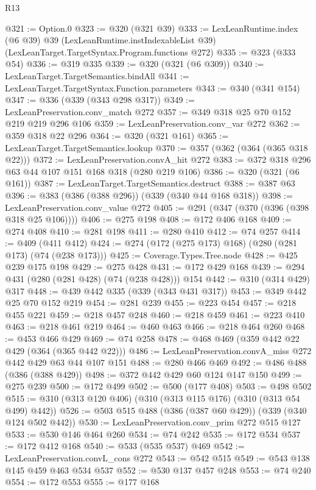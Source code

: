 \begin{lexlean}{R13}
\begin{coremodule}
@321 := Option.{0}
@323 := @320 (@321 @39)
@333 := LexLeanRuntime.index
    (@6 @39)
    @39
    (LexLeanRuntime.instIndexableList @39)
    (LexLeanTarget.TargetSyntax.Program.functions @272)
@335 := @323 (@333 @54)
@336 := @319 @335
@339 := @320 (@321 (@6 @309))
@340 := LexLeanTarget.TargetSemantics.bindAll
@341 := LexLeanTarget.TargetSyntax.Function.parameters
@343 := @340 (@341 @154)
@347 := @336 (@339 (@343 @298 @317))
@349 := LexLeanPreservation.conv_match @272
@357 := @349 @318 @25 @70 @152 @219 @219 @296 @106
@359 := LexLeanPreservation.conv_var @272
@362 := @359 @318 @22 @296
@364 := @320 (@321 @161)
@365 := LexLeanTarget.TargetSemantics.lookup
@370 := @357 (@362 (@364 (@365 @318 @22)))
@372 := LexLeanPreservation.convA_hit @272
@383 := @372 @318 @296 @63 @44 @107 @151 @168 @318 (@280 @219 @106)
@386 := @320 (@321 (@6 @161))
@387 := LexLeanTarget.TargetSemantics.destruct
@388 := @387 @63
@396 := @383 (@386 (@388 @296)) (@339 (@340 @44 @168 @318))
@398 := LexLeanPreservation.conv_value @272
@405 := @291 (@347 (@370 (@396 (@398 @318 @25 @106))))
@406 := @275 @198
@408 := @172 @406 @168
@409 := @274 @408
@410 := @281 @198
@411 := @280 @410
@412 := @74 @257
@414 := @409 (@411 @412)
@424 := @274 (@172 (@275 @173) @168) (@280 (@281 @173) (@74 (@238 @173)))
@425 := Coverage.Types.Tree.node
@428 := @425 @239 @175 @198
@429 := @275 @428
@431 := @172 @429 @168
@439 := @294 @431 (@280 (@281 @428) (@74 (@238 @428))) @154
@442 := @310 (@314 @429) @317
@448 := @439 @442 @335 (@339 (@343 @431 @317))
@453 := @349 @442 @25 @70 @152 @219
@454 := @281 @239
@455 := @223 @454
@457 := @218 @455 @221
@459 := @218 @457 @248
@460 := @218 @459
@461 := @223 @410
@463 := @218 @461 @219
@464 := @460 @463
@466 := @218 @464 @260
@468 := @453 @466 @429
@469 := @74 @258
@478 := @468 @469 (@359 @442 @22 @429 (@364 (@365 @442 @22)))
@486 := LexLeanPreservation.convA_miss @272 @442 @429 @63 @44 @107 @151
@488 := @280 @466 @469
@492 := @486 @488 (@386 (@388 @429))
@498 := @372 @442 @429 @60 @124 @147 @150
@499 := @275 @239
@500 := @172 @499
@502 := @500 (@177 @408)
@503 := @498 @502
@515 := @310 (@313 @120 @406) (@310 (@313 @115 @176) (@310 (@313 @54 @499) @442))
@526 := @503 @515 @488 (@386 (@387 @60 @429)) (@339 (@340 @124 @502 @442))
@530 := LexLeanPreservation.conv_prim @272 @515 @127
@533 := @530 @146 @464 @260
@534 := @74 @242
@535 := @172 @534
@537 := @172 @412 @168
@540 := @533 (@535 @537) @469
@542 := LexLeanPreservation.convL_cons @272
@543 := @542 @515
@549 := @543 @138 @145 @459 @463 @534 @537
@552 := @530 @137 @457 @248
@553 := @74 @240
@554 := @172 @553
@555 := @177 @168

\end{coremodule}
\end{lexlean}
